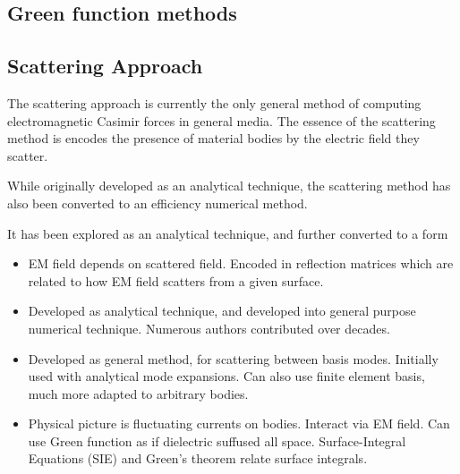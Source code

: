 \subsection{Green function methods}


\subsection{Scattering Approach}

The scattering approach is currently the only general method of computing 
electromagnetic Casimir forces in general media.  The essence of the scattering method 
is encodes the presence of material bodies by the electric field they scatter.  

While originally developed as an analytical
technique, the scattering method has also been converted to an efficiency numerical method.  

It has been explored as an analytical technique,
and further converted to a form 
\begin{itemize}
\item EM field depends on scattered field.  Encoded in reflection matrices
which are related to how EM field scatters from a given surface.  
\item Developed as analytical technique, and developed into general purpose numerical technique.
Numerous authors contributed over decades.
\end{itemize}

\begin{itemize}
  \item Developed as general method, for scattering between basis modes.  
    Initially used with analytical mode expansions.  Can also use finite element basis,
    much more adapted to arbitrary bodies.  
\item Physical picture is fluctuating currents on bodies.  Interact via EM field.
  Can use Green function as if dielectric suffused all space.  
Surface-Integral Equations (SIE) and Green's theorem relate surface integrals.  
\end{itemize}

